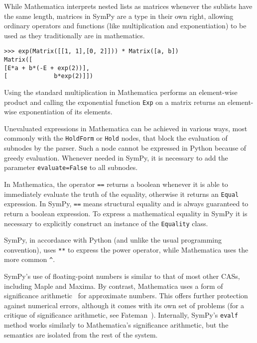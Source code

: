 
While Mathematica interprets nested lists as matrices whenever
the sublists have the same length, matrices in SymPy are a type in their own
right, allowing ordinary operators and functions (like multiplication and
exponentiation) to be used as they traditionally are in mathematics.
\begin{verbatim}
>>> exp(Matrix([[1, 1],[0, 2]])) * Matrix([a, b])
Matrix([
[E*a + b*(-E + exp(2))],
[             b*exp(2)]])
\end{verbatim}

Using the standard multiplication in Mathematica performs an element-wise
product and
calling the exponential function \texttt{Exp} on a matrix
returns an element-wise exponentiation of its elements.


Unevaluated expressions in Mathematica can be achieved in various ways,
most commonly with the \texttt{HoldForm} or \texttt{Hold} nodes,
that block the evaluation of subnodes by the parser.
Such a node cannot be expressed in Python because of greedy evaluation.
Whenever needed in SymPy, it is necessary to add the parameter \texttt{evaluate=False}
to all subnodes.


In Mathematica, the operator \texttt{==} returns a boolean whenever it is able
to immediately evaluate the truth of the equality, otherwise it returns an
\texttt{Equal} expression.  In SymPy, \texttt{==} means structural equality and
is always guaranteed to return a boolean expression.  To express a mathematical equality in
SymPy it is necessary to explicitly construct an instance of the \texttt{Equality}
class.


SymPy, in accordance with Python (and unlike the usual programming convention),
uses \texttt{**} to express the power operator, while Mathematica uses the more
common \verb|^|.


SymPy's use of floating-point numbers is similar to that of most
other CASs, including Maple and Maxima.
By contrast, Mathematica uses a form
of significance arithmetic~\cite{Sofroniou2005precise} for approximate numbers.
This offers further protection against numerical errors,
although it comes with its own set of problems
(for a critique of significance arithmetic, see Fateman~\cite{Fateman1992}).
Internally, SymPy's \texttt{evalf} method works similarly to Mathematica's
significance arithmetic, but the semantics are isolated from the rest of the system.
